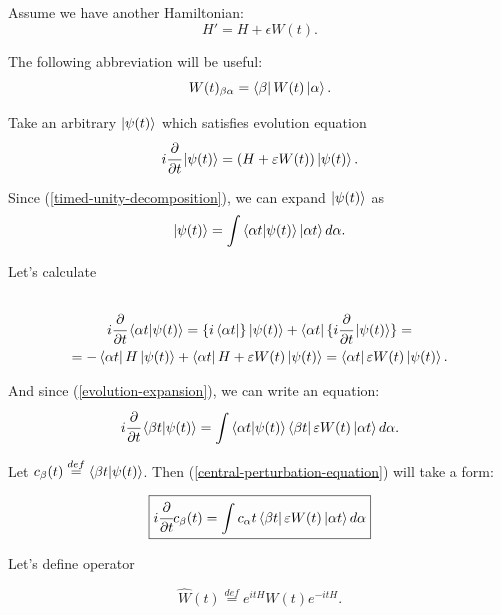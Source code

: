 \documentclass[main.tex]{subfiles}
\begin{document}
Assume we have another Hamiltonian:
\begin{equation}
H' = H + \epsilon W(t).
\end{equation} 

The following abbreviation will be useful:
$$W(t)_{\beta \alpha} = \bra{\beta} W(t) \ket{\alpha}.$$

Take an arbitrary $\ket{\psi(t)}$ which satisfies evolution equation
\begin{equation}
i\cfrac{\partial}{\partial t}\ket{\psi(t)} = (H + \varepsilon W(t)) \ket{\psi(t)}.
\end{equation}

Since (\ref{timed-unity-decomposition}), we can expand $\ket{\psi(t)}$ as 
\begin{equation}
\label{evolution-expansion}
\ket{\psi(t)} = \int \bra{\alpha t}\ket{\psi(t)}\ket{\alpha t}d\alpha.
\end{equation}

Let's calculate
\begin{multline*}\\
i\cfrac{\partial}{\partial t} \bra{\alpha t}\ket{\psi(t)} = \{i \bra{\alpha t}\} \ket{\psi(t)} + \bra{\alpha t}\{i \cfrac{\partial}{\partial t} \ket{\psi(t)}\} = 
\\
= - \bra{\alpha t} H \ket{\psi(t)} + \bra{\alpha t} H + \varepsilon W(t)\ket{\psi(t)}= \bra{\alpha t} \varepsilon W(t) \ket{\psi(t)}.\\
\end{multline*}

And since (\ref{evolution-expansion}), we can write an equation:
\begin{equation}
\label{central-perturbation-equation}
i\cfrac{\partial}{\partial t} \bra{\beta t}\ket{\psi(t)} = \int \bra{\alpha t}\ket{\psi(t)}\bra{\beta t}\varepsilon W(t) \ket{\alpha t}d\alpha.
\end{equation}

Let $c_\beta(t) \stackrel{def}{=}  \bra{\beta t}\ket{\psi(t)}$. Then (\ref{central-perturbation-equation}) will take a form:

\begin{equation}
\boxed{
i\cfrac{\partial}{\partial t} c_\beta(t) = \int c_\alpha t\bra{\beta t} \varepsilon W(t) \ket{\alpha t}d\alpha
}
\end{equation}

Let's define operator

 
\begin{equation}
\hat{W}(t)\stackrel{def}{=} e^{itH} W(t) e^{-itH}.
\end{equation}
\end{document}

